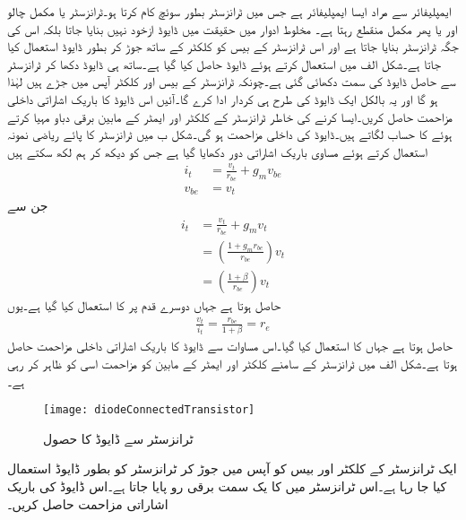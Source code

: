  ایمپلیفائر سے مراد ایسا ایمپلیفائر ہے  جس میں ٹرانزسٹر بطور سوئچ کام کرتا ہو۔ٹرانزسٹر یا مکمل چالو اور یا پھر مکمل منقطع رہتا ہے۔
مخلوط ادوار میں حقیقت میں ڈایوڈ ازخود نہیں بنایا جاتا بلکہ اس کی جگہ ٹرانزسٹر بنایا جاتا ہے اور اس ٹرانزسٹر کے بیس کو کلکٹر  کے ساتھ جوڑ کر بطور ڈایوڈ استعمال کیا جاتا ہے۔شکل  الف  میں  استعمال کرتے ہوئے  ڈایوڈ حاصل کیا گیا ہے۔ساتھ ہی ڈایوڈ دکھا کر ٹرانزسٹر سے حاصل ڈایوڈ کی سمت دکھائی گئی ہے۔چونکہ ٹرانزسٹر کے بیس اور کلکٹر  آپس میں جڑے ہیں لہٰذا  ہو گا اور یہ بالکل ایک ڈایوڈ کی طرح ہی کردار ادا کرے گا۔آئیں اس ڈایوڈ کا باریک اشاراتی داخلی مزاحمت حاصل کریں۔ایسا کرنے کی خاطر ٹرانزسٹر کے کلکٹر  اور ایمٹر کے مابین  برقی دباو مہیا کرتے ہوئے  کا حساب لگاتے ہیں۔ڈایوڈ کی داخلی مزاحمت  ہو گی۔شکل  ب میں ٹرانزسٹر کا پائے ریاضی نمونہ  استعمال کرتے ہوئے مساوی باریک اشاراتی دور دکھایا گیا ہے جس کو دیکھ کر ہم لکھ سکتے ہیں
\begin{align*}
i_t&=\frac{v_t}{r_{be}}+g_m v_{be}\\
v_{be}&=v_t
\end{align*}
جن سے
\begin{align*}
i_t&=\frac{v_t}{r_{be}}+g_m v_{t}\\
&=\left(\frac{1+g_m r_{be}}{r_{be}}\right) v_t\\
&=\left(\frac{1+\beta}{r_{be}}\right) v_t
\end{align*}
حاصل ہوتا ہے جہاں دوسرے قدم پر  کا استعمال کیا گیا ہے۔یوں
\begin{align}\label{مساوات_ٹرانزسٹر_ڈایوڈ_جڑے_ٹرانزسٹر_کی_مزاحمت}
\frac{v_t}{i_t}=\frac{r_{be}}{1+\beta}=r_e
\end{align}
حاصل ہوتا ہے جہاں  کا استعمال کیا گیا۔اس مساوات سے ڈایوڈ کا باریک اشاراتی داخلی مزاحمت  حاصل ہوتا ہے۔شکل  الف میں ٹرانزسٹر کے سامنے  کلکٹر  اور ایمٹر کے مابین کو  مزاحمت اسی کو ظاہر کر رہی ہے۔
%
\begin{figure}
\centering
\texttt{[image: diodeConnectedTransistor]}
\caption{ٹرانزسٹر سے ڈایوڈ کا حصول}
\label{شکل_ٹرانزسٹر_سے_ڈایوڈ_کا_حصول}
\end{figure}
ایک ٹرانزسٹر کے کلکٹر  اور بیس کو آپس میں جوڑ کر ٹرانزسٹر کو بطور ڈایوڈ استعمال کیا جا رہا ہے۔اس ٹرانزسٹر میں  کا یک سمت برقی رو پایا جاتا ہے۔اس ڈایوڈ کی باریک اشاراتی مزاحمت حاصل کریں۔

